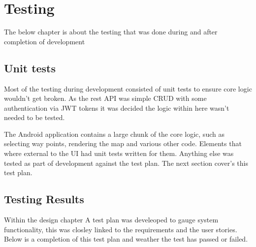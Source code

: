 \section{Testing}
The below chapter is about the testing that was done during and after completion of development

\subsection{Unit tests}
Most of the testing during development consisted of unit tests to ensure core logic wouldn't get broken. As the rest API was simple CRUD with some authentication via JWT tokens it was decided the logic within here wasn't needed to be tested. 

The Android application contains a large chunk of the core logic, such as selecting way points, rendering the map and various other code. Elements that where external to the UI had unit tests written for them. Anything else was tested as part of development against the test plan. The next section cover's this test plan.

\subsection{Testing Results}
Within the design chapter A test plan was develeoped to gauge system functionality, this was closley linked to the requirements and the user stories. Below is a completion of this test plan and weather the test has passed or failed.